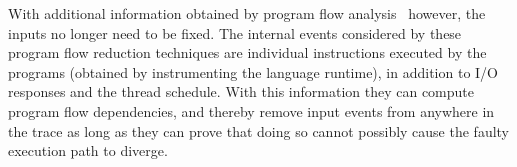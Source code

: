 
With additional information obtained by program flow
analysis~\cite{Lee:2011:TGR:1993498.1993528,tallam2007enabling,huang2012lean}
however, the inputs no longer need to be fixed. The internal events considered by these program flow reduction
techniques are individual instructions executed by the
programs (obtained by instrumenting the language runtime), in addition to I/O responses and the thread schedule.
With this information they can compute
program flow dependencies, and thereby remove input events from anywhere in the trace as long as they
can prove that doing so cannot possibly cause the faulty execution path to diverge.

